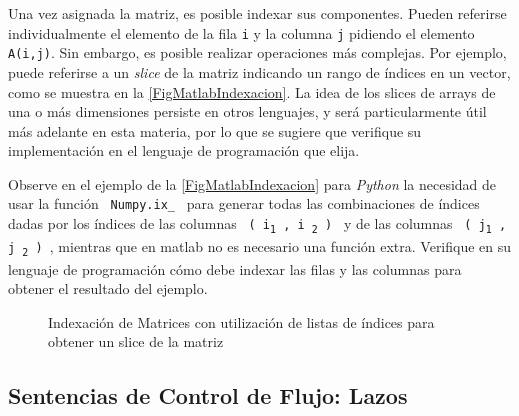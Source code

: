 Una vez asignada la matriz, es posible indexar sus componentes. 
Pueden referirse individualmente el elemento de la fila \texttt{i} y la
columna \texttt{j} pidiendo el elemento \texttt{A(i,j)}. Sin 
embargo, es posible realizar operaciones más complejas. Por ejemplo,
puede referirse a un \emph{slice} de la matriz indicando un rango 
de índices en un vector, como se muestra en la
\autoref{FigMatlabIndexacion}. La idea de los slices de arrays de una o 
más dimensiones persiste en otros lenguajes, y será particularmente
útil más adelante en esta materia, por lo que se sugiere que
verifique su implementación en el lenguaje de programación 
que elija. 

Observe en el ejemplo de la \autoref{FigMatlabIndexacion} para \emph{Python}
la necesidad de usar la función \texttt{ Numpy.ix\_ } para generar todas las 
combinaciones de índices dadas por los índices de las columnas 
\texttt{ ( i\textsubscript{1} , i \textsubscript{2} ) }
y de las columnas \texttt{ ( j\textsubscript{1} , j \textsubscript{2} ) }, 
mientras que en matlab no es necesario
una función extra. Verifique en su lenguaje de programación cómo debe indexar 
las filas y las columnas para obtener el resultado del ejemplo. 

\mode*

\begin{figure}
  \caption{ Indexación de Matrices con utilización de listas de índices para
 obtener un slice de la matriz \label{FigMatlabIndexacion} }
\end{figure}

\mode*

\subsection{Sentencias de Control de Flujo: Lazos}

